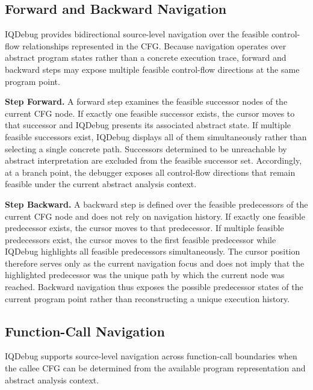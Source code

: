 \documentclass[11pt,oneside]{report}
\theoremstyle{plain}
\theoremstyle{definition}
\theoremstyle{remark}
\begin{document}
\subsection{Forward and Backward Navigation}
\label{subsec:design:navigation-forward-backward}
IQDebug provides bidirectional source-level navigation over the feasible control-flow relationships represented in the CFG. Because navigation operates over abstract program states rather than a concrete execution trace, forward and backward steps may expose multiple feasible control-flow directions at the same program point.

\smallskip
\noindent\textbf{Step Forward.}
A forward step examines the feasible successor nodes of the current CFG node.
If exactly one feasible successor exists, the cursor moves to that successor and IQDebug presents its associated abstract state.
If multiple feasible successors exist, IQDebug displays all of them simultaneously rather than selecting a single concrete path.
Successors determined to be unreachable by abstract interpretation are excluded from the feasible successor set.
Accordingly, at a branch point, the debugger exposes all control-flow directions that remain feasible under the current abstract analysis context.

\smallskip
\noindent\textbf{Step Backward.}
A backward step is defined over the feasible predecessors of the current CFG node and does not rely on navigation history.
If exactly one feasible predecessor exists, the cursor moves to that predecessor.
If multiple feasible predecessors exist, the cursor moves to the first feasible predecessor while IQDebug highlights all feasible predecessors simultaneously.
The cursor position therefore serves only as the current navigation focus and does not imply that the highlighted predecessor was the unique path by which the current node was reached.
Backward navigation thus exposes the possible predecessor states of the current program point rather than reconstructing a unique execution history.

\subsection{Function-Call Navigation}
\label{subsec:design:navigation-call}
IQDebug supports source-level navigation across function-call boundaries when the callee CFG can be determined from the available program representation and abstract analysis context.
\end{document}
